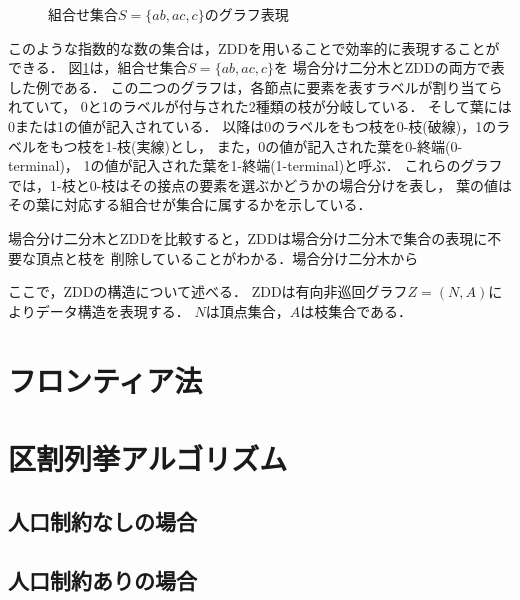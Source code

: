 \begin{figure}[htbp]
\begin{minipage}[b]{0.48\hsize}
    \label{zdd_graph}
  \end{minipage}
  \caption{組合せ集合$S=\{ab,ac,c\}$のグラフ表現}\label{combined_set}
\end{figure}

このような指数的な数の集合は，ZDDを用いることで効率的に表現することができる．
図\ref{combined_set}は，組合せ集合$S=\{ab,ac,c\}$を
場合分け二分木とZDDの両方で表した例である．
この二つのグラフは，各節点に要素を表すラベルが割り当てられていて，
0と1のラベルが付与された2種類の枝が分岐している．
そして葉には0または1の値が記入されている．
以降は0のラベルをもつ枝を0-枝(破線)，1のラベルをもつ枝を1-枝(実線)とし，
また，0の値が記入された葉を0-終端(0-terminal)，
1の値が記入された葉を1-終端(1-terminal)と呼ぶ．
これらのグラフでは，1-枝と0-枝はその接点の要素を選ぶかどうかの場合分けを表し，
葉の値はその葉に対応する組合せが集合に属するかを示している．

場合分け二分木とZDDを比較すると，ZDDは場合分け二分木で集合の表現に不要な頂点と枝を
削除していることがわかる．場合分け二分木から

ここで，ZDDの構造について述べる．
ZDDは有向非巡回グラフ$Z=(N,A)$によりデータ構造を表現する．
$N$は頂点集合，$A$は枝集合である．

\section{フロンティア法}

\section{区割列挙アルゴリズム}

\subsection{人口制約なしの場合}

\subsection{人口制約ありの場合}

